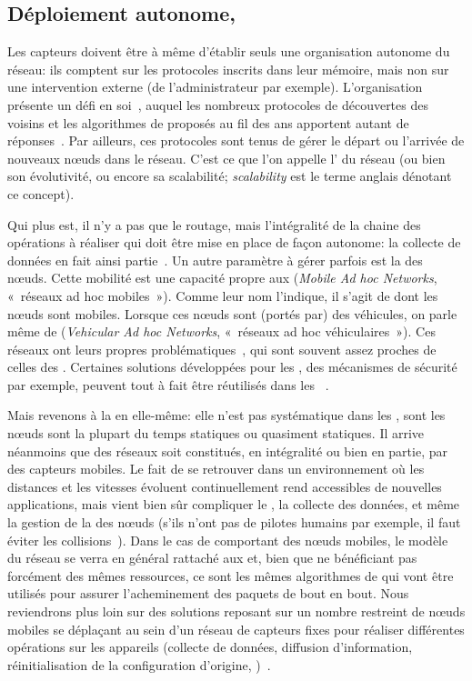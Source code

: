     \subsection{Déploiement autonome, }
Les capteurs doivent être à même d'établir seuls une organisation autonome du réseau: ils comptent sur les protocoles inscrits dans leur mémoire, mais non sur une intervention externe (de l'administrateur par exemple).
L'organisation présente un défi en soi~\cite{TV08}, auquel les nombreux protocoles de découvertes des voisins et les algorithmes de  proposés au fil des ans apportent autant de réponses~\cite{DQWH13}.
Par ailleurs, ces protocoles sont tenus de gérer le départ ou l'arrivée de nouveaux nœuds dans le réseau.
C'est ce que l'on appelle l' du réseau (ou bien son évolutivité, ou encore sa scalabilité; \textit{scalability} est le terme anglais dénotant ce concept).

Qui plus est, il n'y a pas que le routage, mais l'intégralité de la chaine des opérations à réaliser qui doit être mise en place de façon autonome: la collecte de données en fait ainsi partie~\cite{ZWPT10}.
Un autre paramètre à gérer parfois est la  des nœuds.
Cette mobilité est une capacité propre aux \manet (\textit{Mobile Ad hoc Networks}, « réseaux ad hoc mobiles »).
Comme leur nom l'indique, il s'agit de \wanet dont les nœuds sont mobiles.
Lorsque ces nœuds sont (portés par) des véhicules, on parle même de \vanet (\textit{Vehicular Ad hoc Networks}, « réseaux ad hoc véhiculaires »).
Ces réseaux ont leurs propres problématiques~\cite{DYK12}, qui sont souvent assez proches de celles des \rcsfs.
Certaines solutions développées pour les \manet, des mécanismes de sécurité par exemple, peuvent tout à fait être réutilisés dans les \rcs~\cite{BMS13}.

Mais revenons à la  en elle-même: elle n'est pas systématique dans les \rcsfs, sont les nœuds sont la plupart du temps statiques ou quasiment statiques.
Il arrive néanmoins que des réseaux soit constitués, en intégralité ou bien en partie, par des capteurs mobiles.
Le fait de se retrouver dans un environnement où les distances et les vitesses évoluent continuellement rend accessibles de nouvelles applications, mais vient bien sûr compliquer le , la collecte des données, et même la gestion de la  des nœuds (s'ils n'ont pas de pilotes humains par exemple, il faut éviter les collisions~\cite{E-ZCGGK12}).
Dans le cas de \rcs comportant des nœuds mobiles, le modèle du réseau se verra en général rattaché aux \manet et, bien que ne bénéficiant pas forcément des mêmes ressources, ce sont les mêmes algorithmes de  qui vont être utilisés pour assurer l'acheminement des paquets de bout en bout.
Nous reviendrons plus loin sur des solutions reposant sur un nombre restreint de nœuds mobiles se déplaçant au sein d'un réseau de capteurs fixes pour réaliser différentes opérations sur les appareils (collecte de données, diffusion d'information, réinitialisation de la configuration d'origine, \etc)~\cite{HR13}.

